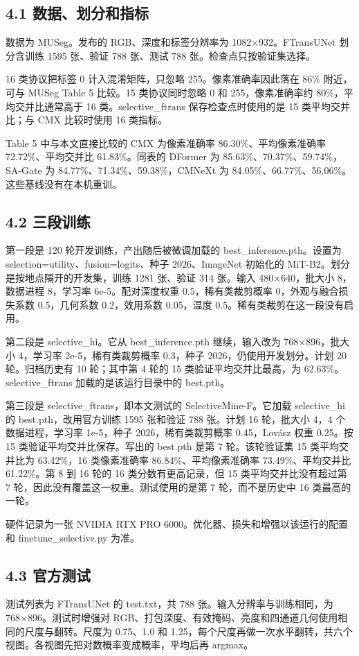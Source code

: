 \documentclass[UTF8,a4paper,11pt]{ctexart}
\begin{document}
\subsection*{4.1 数据、划分和指标}
数据为 MUSeg。发布的 RGB、深度和标签分辨率为 1082×932。FTransUNet 划分含训练 1595 张、验证 788 张、测试 788 张。检查点只按验证集选择。

16 类协议把标签 0 计入混淆矩阵，只忽略 255。像素准确率因此落在 86\% 附近，可与 MUSeg Table 5 比较。15 类协议同时忽略 0 和 255，像素准确率约 80\%，平均交并比通常高于 16 类。selective\_ftrans 保存检查点时使用的是 15 类平均交并比；与 CMX 比较时使用 16 类指标。

Table 5 中与本文直接比较的 CMX 为像素准确率 86.30\%、平均像素准确率 72.72\%、平均交并比 61.83\%。同表的 DFormer 为 85.63\%、70.37\%、59.74\%，SA-Gate 为 84.77\%、71.34\%、59.38\%，CMNeXt 为 84.05\%、66.77\%、56.06\%。这些基线没有在本机重训。

\subsection*{4.2 三段训练}
第一段是 120 轮开发训练，产出随后被微调加载的 best\_inference.pth。设置为 selection=utility、fusion=logits、种子 2026、ImageNet 初始化的 MiT-B2。划分是按地点隔开的开发集，训练 1281 张、验证 314 张。输入 480×640，批大小 8，数据进程 8，学习率 6e-5。配对深度权重 0.5，稀有类裁剪概率 0，外观与融合损失系数 0.5，几何系数 0.2，效用系数 0.05，温度 0.5。稀有类裁剪在这一段没有启用。

第二段是 selective\_hi。它从 best\_inference.pth 继续，输入改为 768×896，批大小 4，学习率 2e-5，稀有类裁剪概率 0.3，种子 2026，仍使用开发划分。计划 20 轮。归档历史有 10 轮；其中第 4 轮的 15 类验证平均交并比最高，为 62.63\%。selective\_ftrans 加载的是该运行目录中的 best.pth。

第三段是 selective\_ftrans，即本文测试的 SelectiveMine-F。它加载 selective\_hi 的 best.pth，改用官方训练 1595 张和验证 788 张。计划 16 轮，批大小 4，4 个数据进程，学习率 1e-5，种子 2026，稀有类裁剪概率 0.45，Lovász 权重 0.25。按 15 类验证平均交并比保存。写出的 best.pth 是第 7 轮。该轮验证集 15 类平均交并比为 63.42\%，16 类像素准确率 86.84\%、平均像素准确率 73.49\%、平均交并比 61.22\%。第 8 到 16 轮的 16 类分数有更高记录，但 15 类平均交并比没有超过第 7 轮，因此没有覆盖这一权重。测试使用的是第 7 轮，而不是历史中 16 类最高的一轮。

硬件记录为一张 NVIDIA RTX PRO 6000。优化器、损失和增强以该运行的配置和 finetune\_selective.py 为准。

\subsection*{4.3 官方测试}
测试列表为 FTransUNet 的 test.txt，共 788 张。输入分辨率与训练相同，为 768×896。测试时增强对 RGB、打包深度、有效掩码、亮度和四通道几何使用相同的尺度与翻转。尺度为 0.75、1.0 和 1.25，每个尺度再做一次水平翻转，共六个视图。各视图先把对数概率变成概率，平均后再 argmax。
\end{document}

